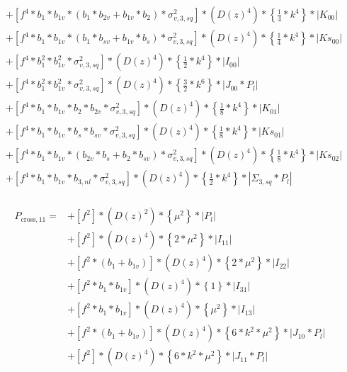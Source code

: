 \documentclass{article}
\begin{document}
\begin{equation}
\begin{aligned}
&+\left[f^{4}*b_{1}*b_{1v}*(b_{1}*b_{2v} + b_{1v}*b_{2})*\sigma_{v,3,sq}^{2}\right]*\left(D(z)^{4}\right)*\left\{\frac{1}{4}*k^{4}\right\}*\left|K_{00}\right| \\
&+\left[f^{4}*b_{1}*b_{1v}*(b_{1}*b_{sv} + b_{1v}*b_{s})*\sigma_{v,3,sq}^{2}\right]*\left(D(z)^{4}\right)*\left\{\frac{1}{4}*k^{4}\right\}*\left|Ks_{00}\right| \\
&+\left[f^{4}*b_{1}^{2}*b_{1v}^{2}*\sigma_{v,3,sq}^{2}\right]*\left(D(z)^{4}\right)*\left\{\frac{1}{2}*k^{4}\right\}*\left|I_{00}\right| \\
&+\left[f^{4}*b_{1}^{2}*b_{1v}^{2}*\sigma_{v,3,sq}^{2}\right]*\left(D(z)^{4}\right)*\left\{\frac{3}{2}*k^{6}\right\}*\left|J_{00}*P_l\right| \\
&+\left[f^{4}*b_{1}*b_{1v}*b_{2}*b_{2v}*\sigma_{v,3,sq}^{2}\right]*\left(D(z)^{4}\right)*\left\{\frac{1}{8}*k^{4}\right\}*\left|K_{01}\right| \\
&+\left[f^{4}*b_{1}*b_{1v}*b_{s}*b_{sv}*\sigma_{v,3,sq}^{2}\right]*\left(D(z)^{4}\right)*\left\{\frac{1}{8}*k^{4}\right\}*\left|Ks_{01}\right| \\
&+\left[f^{4}*b_{1}*b_{1v}*(b_{2v}*b_{s} + b_{2}*b_{sv})*\sigma_{v,3,sq}^{2}\right]*\left(D(z)^{4}\right)*\left\{\frac{1}{8}*k^{4}\right\}*\left|Ks_{02}\right| \\
&+\left[f^{4}*b_{1}*b_{1v}*b_{3,nl}*\sigma_{v,3,sq}^{2}\right]*\left(D(z)^{4}\right)*\left\{\frac{1}{2}*k^{4}\right\}*\left|\Sigma_{3,sq}*P_l\right| \\
\end{aligned}
\end{equation}



\begin{equation}
\begin{aligned} 
P_{\mathrm{cross},11}=
&+\left[f^{2}\right]*\left(D(z)^{2}\right)*\left\{\mu^{2}\right\}*\left|P_l\right| \\
&+\left[f^{2}\right]*\left(D(z)^{4}\right)*\left\{2*\mu^{2}\right\}*\left|I_{11}\right| \\
&+\left[f^{2}*(b_{1}+b_{1v})\right]*\left(D(z)^{4}\right)*\left\{2*\mu^{2}\right\}*\left|I_{22}\right| \\
&+\left[f^{2}*b_{1}*b_{1v}\right]*\left(D(z)^{4}\right)*\left\{1\right\}*\left|I_{31}\right| \\
&+\left[f^{2}*b_{1}*b_{1v}\right]*\left(D(z)^{4}\right)*\left\{\mu^{2}\right\}*\left|I_{13}\right| \\
&+\left[f^{2}*(b_{1}+b_{1v})\right]*\left(D(z)^{4}\right)*\left\{6*k^{2}*\mu^{2}\right\}*\left|J_{10}*P_l\right| \\
&+\left[f^{2}\right]*\left(D(z)^{4}\right)*\left\{6*k^{2}*\mu^{2}\right\}*\left|J_{11}*P_l\right| \\
\end{aligned}
\end{equation}
\end{document}
